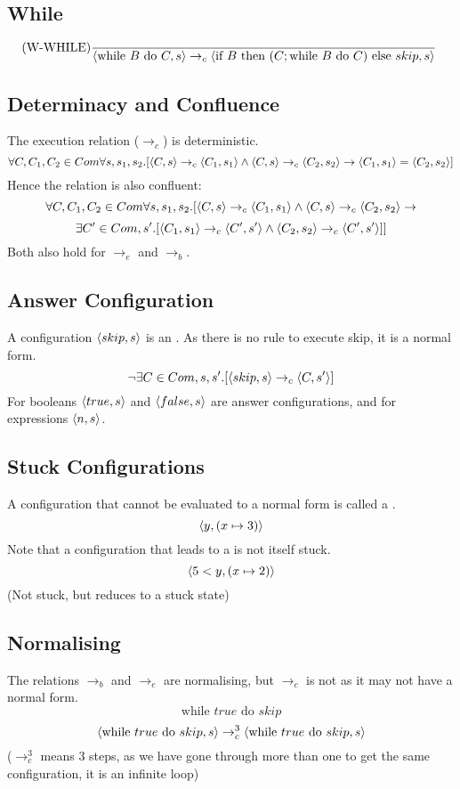 \documentclass{report}
\begin{document}
        \subsection*{While}
            \[\text{(W-WHILE)}\dfrac{}{
                \langle \text{while } B \text{ do } C, s \rangle \to_c \langle \text{if } B \text{ then } (C; \text{while } B \text{ do } C) \text{ else } skip, s \rangle
            } \ \]
        \subsection*{Determinacy and Confluence}
            The execution relation ($\to_c$) is deterministic. 
            \[\forall C,C_1,C_2 \in Com \forall s,s_1,s_2 .[\langle C, s \rangle \to_c \langle C_1, s_1 \rangle \land \langle C, s \rangle \to_c \langle C_2, s_2 \rangle \rightarrow \langle C_1, s_1 \rangle = \langle C_2, s_2 \rangle]\]
            Hence the relation is also confluent:
            \[\forall C,C_1,C_2 \in Com \forall s,s_1,s_2 .[\langle C, s \rangle \to_c \langle C_1, s_1 \rangle \land \langle C, s \rangle \to_c \langle C_2, s_2 \rangle \rightarrow \]
            \[\exists C' \in Com, s' . [\langle C_1, s_1 \rangle \to_c \langle C', s' \rangle \land \langle C_2, s_2 \rangle\to_c \langle C', s' \rangle ]]\]
            Both also hold for $\to_e$ and $\to_b$.
        \subsection*{Answer Configuration}
            A configuration $\langle skip, s \rangle$ is an . As there is no rule to execute skip, it is a normal form.
            \[\neg\exists C \in Com, s, s' . [\langle skip, s \rangle \to_c \langle C, s' \rangle]\]
            For booleans $\langle true, s \rangle$ and $\langle false, s \rangle$ are answer configurations, and for expressions $\langle n, s \rangle$.
        \subsection*{Stuck Configurations}
            A configuration that cannot be evaluated to a normal form is called a .
            \[\langle y, (x \mapsto 3) \rangle\]
            Note that a configuration that leads to a  is not itself stuck.
            \[\langle 5 < y, (x \mapsto 2) \rangle\]
            (Not stuck, but reduces to a stuck state)
        \subsection*{Normalising}
            The relations $\to_b$ and $\to_e$ are normalising, but $\to_c$ is not as it may not have a normal form.
            \[\text{while } true \text{ do } skip\]
            \[\langle \text{while } true \text{ do } skip, s \rangle \to_c^3 \langle \text{while } true \text{ do } skip, s \rangle\]
            ($\to_c^3$ means 3 steps, as we have gone through more than one to get the same configuration, it is an infinite loop)
\end{document}
